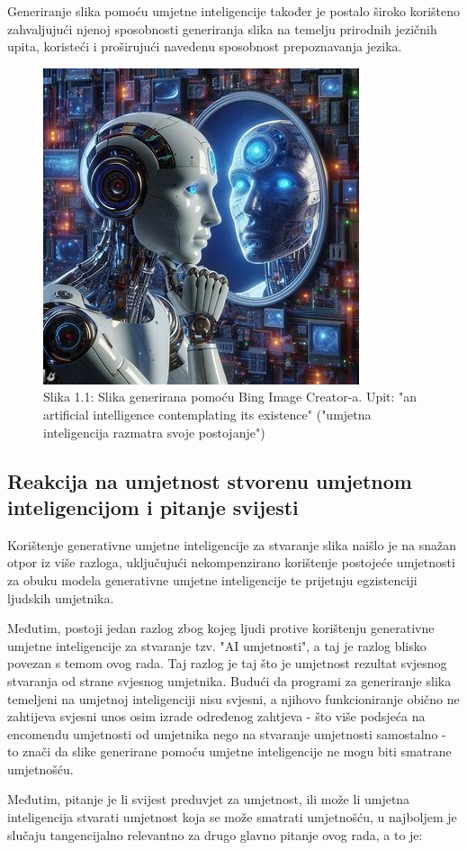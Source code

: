 \documentclass[diplomskirad]{fer}
\begin{document}
Generiranje slika pomoću umjetne inteligencije također je postalo široko korišteno zahvaljujući njenoj sposobnosti generiranja slika na temelju prirodnih jezičnih upita, koristeći i proširujući navedenu sposobnost prepoznavanja jezika.

\begin{figure}[htb]
  \centering
  \includegraphics[width=0.38\linewidth]{Figures/bing image creator prompt 1a.jpeg} 
  \caption{Slika 1.1: Slika generirana pomoću Bing Image Creator-a. Upit: "an artificial intelligence contemplating its existence" ("umjetna inteligencija razmatra svoje postojanje")}
  \label{slk:bing_image}
\end{figure}
\subsection{Reakcija na umjetnost stvorenu umjetnom inteligencijom i pitanje svijesti}
Korištenje generativne umjetne inteligencije za stvaranje slika naišlo je na snažan otpor iz više razloga, uključujući nekompenzirano korištenje postojeće umjetnosti za obuku modela generativne umjetne inteligencije te prijetnju egzistenciji ljudskih umjetnika.

Međutim, postoji jedan razlog zbog kojeg ljudi protive korištenju generativne umjetne inteligencije za stvaranje tzv. "AI umjetnosti", a taj je razlog blisko povezan s temom ovog rada. Taj razlog je taj što je umjetnost rezultat svjesnog stvaranja od strane svjesnog umjetnika. Budući da programi za generiranje slika temeljeni na umjetnoj inteligenciji nisu svjesni, a njihovo funkcioniranje obično ne zahtijeva svjesni unos osim izrade određenog zahtjeva - što više podsjeća na encomendu umjetnosti od umjetnika nego na stvaranje umjetnosti samostalno - to znači da slike generirane pomoću umjetne inteligencije ne mogu biti smatrane umjetnošću.

Međutim, pitanje je li svijest preduvjet za umjetnost, ili može li umjetna inteligencija stvarati umjetnost koja se može smatrati umjetnošću, u najboljem je slučaju tangencijalno relevantno za drugo glavno pitanje ovog rada, a to je:
\end{document}
